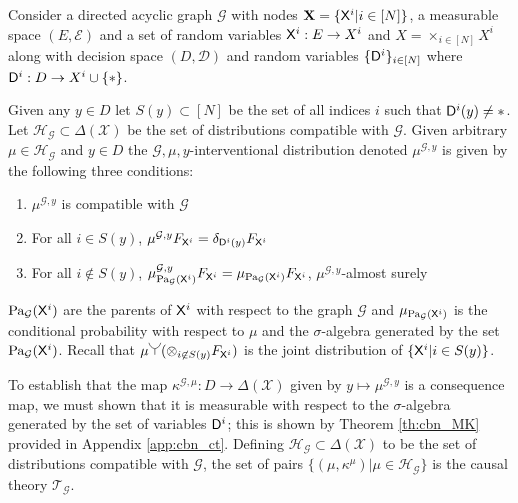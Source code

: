 \begin{definition}\label{def:CBN}

Consider a directed acyclic graph $\mathcal{G}$ with nodes $\mathbf{X}=\{\mathsf{X}^i|i\in [N]\}$, a measurable space $(E,\mathcal{E})$ and a set of random variables $\mathsf{X}^i:E\to X^i$ and $X=\times_{i\in[N]} X^i$ along with decision space $(D,\mathcal{D})$ and random variables $\{\mathsf{D}^i\}_{i\in [N]}$ where $\mathsf{D}^i:D\to X^i\cup\{*\}$.

Given any $y\in D$ let $S(y)\subset[N]$ be the set of all indices $i$ such that $\mathsf{D}^i(y)\neq *$. Let $\mathscr{H}_\mathcal{G}\subset\Delta(\mathcal{X})$ be the set of distributions compatible with $\mathcal{G}$. Given arbitrary $\mu\in \mathscr{H}_\mathcal{G}$ and $y\in D$ the $\mathcal{G},\mu,y$-interventional distribution denoted $\mu^{\mathcal{G},y}$ is given by the following three conditions:
\begin{enumerate}
    \item $\mu^{\mathcal{G},y}$ is compatible with $\mathcal{G}$
    \item For all $i\in S(y)$, $\mu^{\mathcal{G},y}F_{\mathsf{X}^i}=\delta_{\mathsf{D}^i(y)} F_{\mathsf{X}^i}$
    \item For all $i\not \in S(y)$, $\mu^{\mathcal{G},y}_{\text{Pa}_{\mathcal{G}}(\mathsf{X}^i)} F_{\mathsf{X}^i}=\mu_{\text{Pa}_{\mathcal{G}}(\mathsf{X}^i)}F_{\mathsf{X}^i} $, $\mu^{\mathcal{G},y}$-almost surely
\end{enumerate}
\end{definition}

$\text{Pa}_{\mathcal{G}}(\mathsf{X}^i)$ are the parents of $\mathsf{X}^i$ with respect to the graph $\mathcal{G}$ and $\mu_{\text{Pa}_{\mathcal{G}}(\mathsf{X}^i)}$ is the conditional probability with respect to $\mu$ and the $\sigma$-algebra generated by the set $\text{Pa}_{\mathcal{G}}(\mathsf{X}^i)$. Recall that $\mu \splitter{0.15}(\otimes_{i\not\in S(y)} F_{\RV{X}^i})$ is the joint distribution of $\{\mathsf{X}^i|i\in S(y)\}$.

To establish that the map $\kappa^{\mathcal{G},\mu}:D\to \Delta(\mathcal{X})$ given by $y\mapsto \mu^{\mathcal{G},y}$ is a consequence map, we must shown that it is measurable with respect to the $\sigma$-algebra generated by the set of variables $\mathsf{D}^i$; this is shown by Theorem \ref{th:cbn_MK} provided in Appendix \ref{app:cbn_ct}. Defining $\mathscr{H}_{\mathcal{G}}\subset\Delta(\mathcal{X})$ to be the set of distributions compatible with $\mathcal{G}$, the set of pairs $\{(\mu, \kappa^\mu)|\mu\in \mathscr{H}_{\mathcal{G}}\}$ is the causal theory $\mathscr{T}_\mathcal{G}$.

